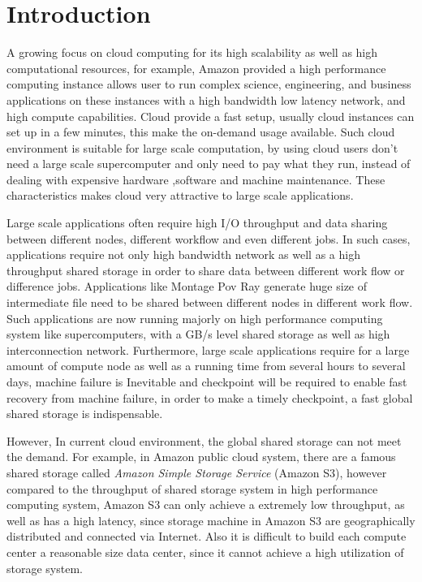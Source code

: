 \section{Introduction}
\label{sec:introduction}
A growing focus on cloud computing for its high scalability as well as high computational
resources, for example, Amazon provided a high performance computing instance allows user to run
complex science, engineering, and business applications on these instances with a high bandwidth low latency
network, and high compute capabilities.
Cloud provide a fast setup, usually cloud instances can set up in a few minutes, this
make the on-demand usage available.
Such cloud environment is suitable for large scale
computation, by using cloud users don't need a large scale supercomputer and only need to pay
what they run, instead of dealing with expensive hardware ,software and machine maintenance.
These characteristics makes cloud very attractive to large scale applications.

Large scale applications often require high I/O
throughput and data sharing between different nodes, different workflow and even different jobs.
In such cases, applications require not only high bandwidth network as well as a high throughput
shared storage in order to share data between different work flow or difference jobs.
Applications like Montage\cite{montage} Pov Ray\cite{povray} generate huge size of intermediate file
need to be shared between different nodes in different work flow.
Such applications are now running majorly on high performance computing system like supercomputers,
with a GB/s level shared storage as well as high interconnection network.
Furthermore, large scale applications require for a large amount of compute node as well as a
running time from several hours to several days, machine failure is Inevitable and checkpoint will be required to enable
fast recovery from machine failure\cite{checkpointing}, in order to make a timely checkpoint, a
fast global shared storage is indispensable.

However, In current cloud environment, the global shared storage can not meet the demand.
For example, in Amazon public cloud system, there are a famous shared storage called \emph{Amazon
Simple Storage Service} (Amazon S3)\cite{AMAZON_AWS}, however compared to the throughput of shared
storage system in high performance computing system, Amazon S3 can only achieve a extremely low throughput,
as well as has a high latency, since storage machine in Amazon S3 are geographically distributed and connected via Internet.
Also it is difficult to build each compute center a reasonable size data center, since it cannot
achieve a high utilization of storage system.

